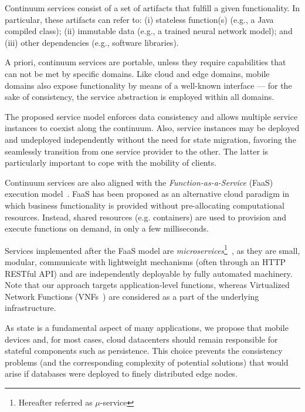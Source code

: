 Continuum services consist of a set of artifacts that fulfill a given functionality. In particular, these artifacts can refer to: (i) stateless function(s) (e.g., a Java compiled class); (ii) immutable data (e.g., a trained neural network model); and (iii) other dependencies (e.g., software libraries).

A priori, continuum services are portable, unless they require capabilities that can not be met by specific domains. Like cloud and edge domains, mobile domains also expose functionality by means of a well-known interface --- for the sake of consistency, the service abstraction is employed within all domains.

The proposed service model enforces data consistency and allows multiple service instances to coexist along the continuum. Also, service instances may be deployed and undeployed independently without the need for state migration, favoring the seamlessly transition from one service provider to the other. The latter is particularly important to cope with the mobility of clients. 

Continuum services are also aligned with the \textit{Function-as-a-Service} (FaaS) execution model~\cite{MateosFaaster17}. FaaS has been proposed as an alternative cloud paradigm in which business functionality is provided without pre-allocating computational resources. Instead, shared resources (e.g. containers) are used to provision and execute functions on demand, in only a few milliseconds. 

Services implemented after the FaaS model are \textit{microservices}\footnote{Hereafter referred as $\mu$-service}~\cite{lewis2014microservices}, as they are small, modular, communicate with lightweight mechanisms (often through an HTTP RESTful API) and are independently deployable by fully automated machinery. Note that our approach targets application-level functions, whereas Virtualized Network Functions (VNFs~\cite{etsimec16}) are considered as a part of the underlying infrastructure.




As state is a fundamental aspect of many applications, we propose that mobile devices and, for most cases, cloud datacenters should remain responsible for stateful components such as persistence. This choice prevents the consistency problems (and the corresponding complexity of potential solutions) that would arise if databases were deployed to finely distributed edge nodes. %

